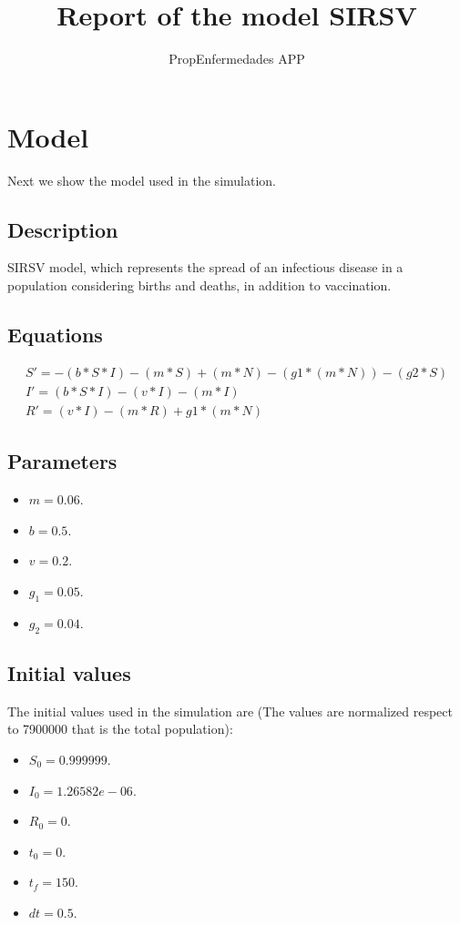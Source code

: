 \documentclass{article}
\title{Report of the model SIRSV}
\author{PropEnfermedades APP}
\date{}
\begin{document}
\maketitle
\section{Model}
Next we show the model used in the simulation.
\subsection*{Description}
SIRSV model, which represents the spread of an infectious disease in a population considering births and deaths, in addition to vaccination.
\subsection*{Equations}
\begin{equation}
\begin{split}
S' = -(b * S * I) - (m * S) + (m * N) - (g1 * (m * N)) - (g2 * S) \\ I' = (b * S * I) - (v * I) - (m * I) \\ R' = (v * I) - (m * R) + g1 * (m * N)
\end{split}
\end{equation}
\subsection*{Parameters}
\begin{itemize}
\item $m = 0.06$. 
\item $b = 0.5$. 
\item $v = 0.2$. 
\item $g_1 = 0.05$. 
\item $g_2 = 0.04$. 
\end{itemize}
\subsection*{Initial values}
The initial values used in the simulation are (The values are normalized respect to 7900000 that is the total population):
\begin{itemize}
\item $S_0 = 0.999999$. 
\item $I_0 = 1.26582e-06$. 
\item $R_0 = 0$. 
\item $t_0 = 0$. 
\item $t_f = 150$. 
\item $dt = 0.5$. 
\end{itemize}
\end{document}
